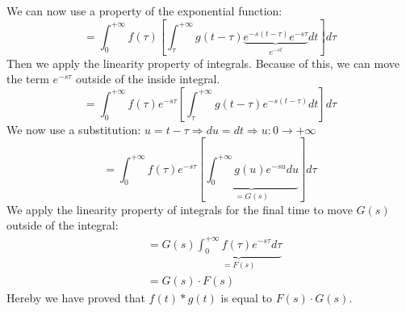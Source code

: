 \documentclass[]{subfiles}
\begin{document}
	We can now use a property of the exponential function:
	\begin{equation*}
		=\int_{0}^{+\infty}f(\tau)\left[ \int_{\tau}^{+\infty}g(t-\tau)\underbrace{e^{-s(t-\tau)}e^{-s\tau}}_{e^{-st}}dt\right]d\tau 
	\end{equation*}
	Then we apply the linearity property of integrals. Because of this, we can move the term $e^{-s\tau}$ outside of the inside integral.
	\begin{equation*}
		=\int_{0}^{+\infty}f(\tau)e^{-s\tau}\left[ \int_{\tau}^{+\infty}g(t-\tau)e^{-s(t-\tau)}dt\right] d\tau
	\end{equation*}%
	\newpage%
	We now use a substitution: $u = t-\tau  \Rightarrow du = dt \Rightarrow u: 0\rightarrow+\infty$
	\begin{equation*}
		=\int_{0}^{+\infty}f(\tau)e^{-s\tau}\left[ \underbrace{\int_{0}^{+\infty}g(u)e^{-su}du}_{=G(s)}\right] d\tau
	\end{equation*}
	We apply the linearity property of integrals for the final time to move $G(s)$ outside of the integral:
	\begin{align*}
		&=G(s)\underbrace{\int_{0}^{+\infty}f(\tau)e^{-s\tau}d\tau}_{=F(s)}\\
		&=G(s)\cdot F(s)
	\end{align*}
	Hereby we have proved that $f(t)\ast g(t)$ is equal to $F(s)\cdot G(s)$.
\end{document}
